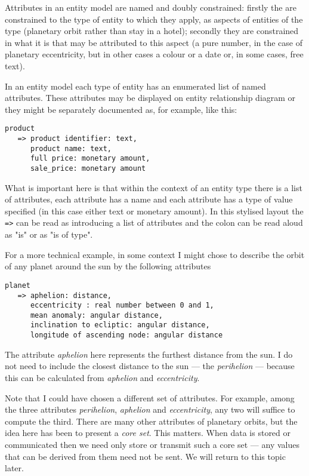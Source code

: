 \mynote 
Attributes in an entity model are named and doubly constrained:
firstly the are constrained to the type of entity to which they apply, 
as aspects of entities of the type (planetary orbit rather than stay in a hotel);
secondly they are constrained in what it is that may be attributed to this aspect 
(a pure number, in the case of planetary eccentricity, 
but in other cases a colour or a date or, in
some cases, free text).

\mynote
In an entity model each type of entity has an enumerated list of named attributes. These attributes may be displayed on entity relationship diagram or they might be separately documented as, for example,
 like this:
\begin{verbatim}
product 
   => product identifier: text,
      product name: text,
      full price: monetary amount,
      sale_price: monetary amount
\end{verbatim}

What is important here is that within the context of an entity type there is a list of attributes, each attribute has a name and each attribute has a type of value specified (in this case either text or monetary amount). In this stylised layout the \verb!=>! can be read as introducing a list of attributes and the colon can be read aloud as "is" or as "is of type". 


For a more technical example, in some context I might chose to describe the orbit of any planet around the sun by the following attributes
\begin{verbatim}
planet 
   => aphelion: distance,
      eccentricity : real number between 0 and 1,
      mean anomaly: angular distance,
      inclination to ecliptic: angular distance,
      longitude of ascending node: angular distance
\end{verbatim}

The attribute \textit{aphelion} here represents the furthest distance from the sun. 
I do not need to include the closest distance to the sun --- the  \textit{perihelion} --- because
this can be calculated from \textit{aphelion} and \textit{eccentricity}.

Note that I could have chosen a different set of attributes. For example, among the three 
attributes \textit{perihelion}, \textit{aphelion} and \textit{eccentricity},  any two will suffice
to compute the third. There are many other attributes of  planetary orbits, but  the idea here has been to present a \textit{core set}. This matters. When data is stored or communicated  then 
we need only store or transmit such a core set  --- any values that can be derived from them need not be sent. We will return to this topic later.

